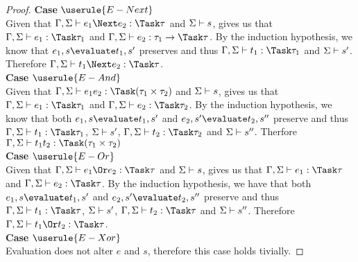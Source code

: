 \begin{proof}
  \noindent\textbf{Case} $\userule{E-Next}$\\
    \indent Given that $\Gamma,\Sigma\infers e_1\Next e_2:\Task \tau$ and
      $\Sigma\vdash s$,  gives us that
      $\Gamma,\Sigma\infers e_1:\Task\tau_1$ and
      $\Gamma,\Sigma\infers e_2:\tau_1 \to \Task \tau$. By the induction
      hypothesis, we know that $e_1,s\evaluate t_1,s'$ preserves and thus
      $\Gamma,\Sigma\infers t_1:\Task\tau_1$ and $\Sigma\vdash s'$. Therefore
      $\Gamma,\Sigma\infers t_1\Next e_2:\Task\tau$.\\

  \noindent\textbf{Case} $\userule{E-And}$\\
    \indent  Given that $\Gamma,\Sigma\infers e_1\And e_2:\Task(\tau_1\times\tau_2)$
      and $\Sigma\vdash s$,  gives us that
      $\Gamma,\Sigma\infers e_1:\Task\tau_1$ and
      $\Gamma,\Sigma\infers e_2:\Task\tau_2$. By the induction hypothesis, we
      know that both $e_1,s\evaluate t_1,s'$ and $e_2,s'\evaluate t_2,s''$
      preserve and thus $\Gamma,\Sigma\infers t_1:\Task\tau_1$,
      $\Sigma\vdash s'$, $\Gamma,\Sigma\infers t_2:\Task\tau_2$ and
      $\Sigma\vdash s''$. Therfore
      $\Gamma,\Sigma\infers t_1\And t_2:\Task(\tau_1\times\tau_2)$\\

  \noindent\textbf{Case} $\userule{E-Or}$\\
    \indent Given that $\Gamma,\Sigma\infers e_1\Or e_2:\Task\tau$ and $\Sigma\vdash s$,  gives us that $\Gamma,\Sigma\infers e_1:\Task\tau$ and
      $\Gamma,\Sigma\infers e_2:\Task\tau$. By the induction hypothesis, we have that both
      $e_1,s\evaluate t_1,s'$ and $e_2,s'\evaluate t_2,s''$ preserve and thus $\Gamma,\Sigma\infers t_1:\Task\tau$, $\Sigma\vdash s'$,
      $\Gamma,\Sigma\infers t_2:\Task\tau$ and $\Sigma\vdash s''$. Therefore $\Gamma,\Sigma\infers t_1\Or t_2:\Task\tau$.\\

  \noindent\textbf{Case} $\userule{E-Xor}$\\
    \indent Evaluation does not alter $e$ and $s$, therefore this case holds tivially.

\end{proof}




